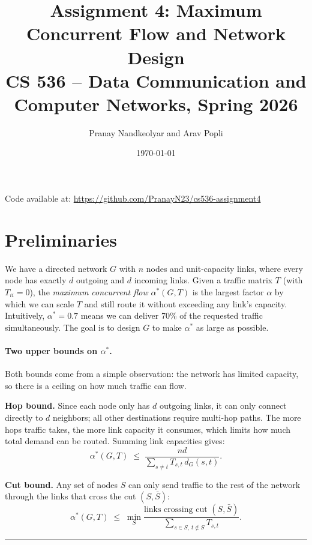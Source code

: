 \documentclass[11pt]{article}
\title{\vspace{-1.5em}Assignment 4: Maximum Concurrent Flow and Network Design\\
\large CS 536 -- Data Communication and Computer Networks, Spring 2026}
\author{Pranay Nandkeolyar and Arav Popli}
\date{\today}
\begin{document}
\maketitle

\begin{center}
\small Code available at:
\url{https://github.com/PranayN23/cs536-assignment4}
\end{center}

\section*{Preliminaries}

We have a directed network $G$ with $n$ nodes and unit-capacity links,
where every node has exactly $d$ outgoing and $d$ incoming links.
Given a traffic matrix $T$ (with $T_{ii}=0$), the \emph{maximum concurrent
flow} $\alpha^*(G,T)$ is the largest factor $\alpha$ by which we can
scale $T$ and still route it without exceeding any link's capacity.
Intuitively, $\alpha^* = 0.7$ means we can deliver 70\% of the requested
traffic simultaneously. The goal is to design $G$ to make $\alpha^*$ as
large as possible.

\paragraph{Two upper bounds on $\alpha^*$.}
Both bounds come from a simple observation: the network has limited
capacity, so there is a ceiling on how much traffic can flow.

\textbf{Hop bound.} Since each node only has $d$ outgoing links, it can
only connect directly to $d$ neighbors; all other destinations require
multi-hop paths. The more hops traffic takes, the more link capacity it
consumes, which limits how much total demand can be routed. Summing
link capacities gives:
\begin{equation}
\alpha^*(G,T) \;\le\;
\frac{nd}{\displaystyle\sum_{s \neq t} T_{s,t}\,d_G(s,t)}.
\label{eq:hopbound}
\end{equation}

\textbf{Cut bound.} Any set of nodes $S$ can only send traffic to the
rest of the network through the links that cross the cut $(S, \bar{S})$:
\begin{equation}
\alpha^*(G,T) \;\le\;
\min_{S}
\frac{\text{links crossing cut }(S,\bar{S})}{\displaystyle\sum_{s\in S,\,t\notin S} T_{s,t}}.
\label{eq:cutbound}
\end{equation}

\bigskip\hrule\bigskip
\end{document}
